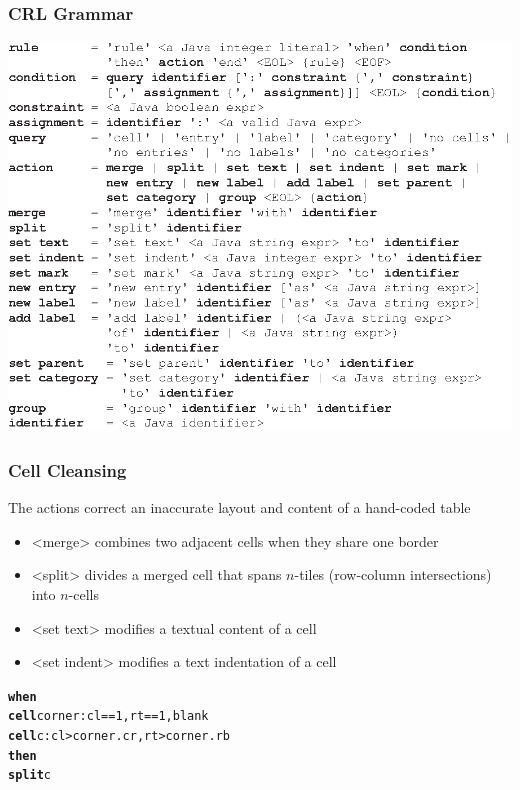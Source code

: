\documentclass[10pt]{beamer}
\begin{document}
\begin{frame}
\frametitle{CRL Grammar}
\includegraphics[width=0.75\linewidth]{BNF}
\end{frame}

\begin{frame}[fragile]
\frametitle{Cell Cleansing}
The actions correct an inaccurate layout and content of a hand-coded table
\begin{itemize}
	\item \alert{<merge>} combines two adjacent cells when they share one border
	\item \alert{<split>} divides a merged cell that spans $n$-tiles (row-column intersections) into $n$-cells
	\item \alert{<set text>} modifies a textual content of a cell
	\item \alert{<set indent>} modifies a text indentation of a cell
\end{itemize}
\footnotesize{
\begin{example}
\begin{alltt}
\textbf{when}
  \textbf{cell} corner: cl == 1, rt == 1, blank
  \textbf{cell} c: cl > corner.cr, rt > corner.rb
\textbf{then}
  \textbf{split} c
\end{alltt}
\end{example}
}
\end{frame}

\end{document}
